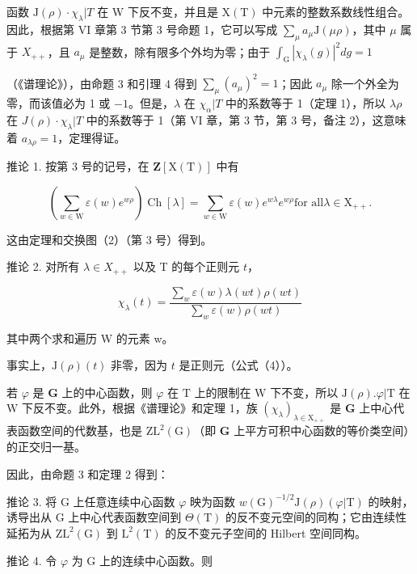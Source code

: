 函数 \(\mathrm{J}(\rho)\cdot\chi_{\lambda}|T\) 在 W 下反不变，并且是 \(\mathrm{X(T)}\) 中元素的整数系数线性组合。因此，根据第 VI 章第 3 节第 3 号命题 1，它可以写成 \(\sum_{\mu}a_{\mu}\mathrm{J}(\mu\rho)\)，其中 \(\mu\) 属于 \(X_{++}\)，且 \(a_{\mu}\) 是整数，除有限多个外均为零；由于 \(\int_{\mathrm{G}}|\chi_{\lambda}(g)|^{2}dg=1\)

（《谱理论》），由命题 3 和引理 4 得到 \(\sum_{\mu}(a_{\mu})^{2} = 1\)；因此 \(a_{\mu}\) 除一个外全为零，而该值必为 1 或 \(-1\)。但是，\(\lambda\) 在 \(\chi_{\alpha}|T\) 中的系数等于 1（定理 1），所以 \(\lambda \rho\) 在 \(J(\rho)\cdot \chi_{\lambda}|T\) 中的系数等于 1（第 VI 章，第 3 节，第 3 号，备注 2），这意味着 \(a_{\lambda \rho} = 1\)，定理得证。

推论 1. 按第 3 号的记号，在 \(\mathbf{Z}[\mathrm{X(T)}]\) 中有

\[
\left(\sum_ {w \in \mathrm{W}} \varepsilon (w) e ^ {w \rho}\right) \operatorname{Ch} [ \lambda ] = \sum_ {w \in \mathrm{W}} \varepsilon (w) e ^ {w \lambda} e ^ {w \rho} \text {for all} \lambda \in \mathrm{X} _ {+ +}.
\]

这由定理和交换图（2）（第 3 号）得到。

推论 2. 对所有 \(\lambda \in X_{++}\) 以及 T 的每个正则元 \(t\)，

\[
\chi_ {\lambda} (t) = \frac {\sum_ {w} \varepsilon (w) \lambda (w t) \rho (w t)}{\sum_ {w} \varepsilon (w) \rho (w t)}\tag{5}
\]

其中两个求和遍历 W 的元素 w。

事实上，\(\mathrm{J}(\rho)(t)\) 非零，因为 \(t\) 是正则元（公式（4））。

若 \(\varphi\) 是 \(\mathbf{G}\) 上的中心函数，则 \(\varphi\) 在 \(\mathrm{T}\) 上的限制在 \(\mathrm{W}\) 下不变，所以 \(\mathrm{J}(\rho). \varphi|\mathrm{T}\) 在 \(\mathrm{W}\) 下反不变。此外，根据《谱理论》和定理 1，族 \((\chi_{\lambda})_{\lambda \in \mathrm{X}_{++}}\) 是 \(\mathbf{G}\) 上中心代表函数空间的代数基，也是 \(\mathrm{ZL}^2(\mathrm{G})\)（即 \(\mathbf{G}\) 上平方可积中心函数的等价类空间）的正交归一基。

因此，由命题 3 和定理 2 得到：

推论 3. 将 G 上任意连续中心函数 \(\varphi\) 映为函数 \(w(\mathrm{G})^{-1/2}\mathrm{J}(\rho)(\varphi|\mathrm{T})\) 的映射，诱导出从 G 上中心代表函数空间到 \(\Theta(\mathrm{T})\) 的反不变元空间的同构；它由连续性延拓为从 \(\mathrm{ZL}^2(\mathrm{G})\) 到 \(\mathrm{L}^2(\mathrm{T})\) 的反不变元子空间的 Hilbert 空间同构。

推论 4. 令 \(\varphi\) 为 G 上的连续中心函数。则

